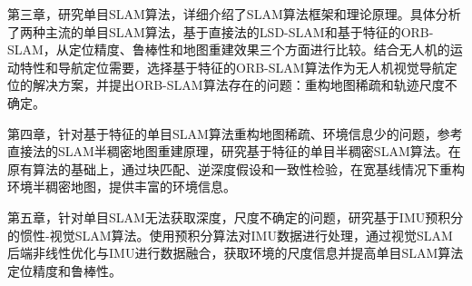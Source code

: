 第三章，研究单目SLAM算法，详细介绍了SLAM算法框架和理论原理。具体分析了两种主流的单目SLAM算法，基于直接法的LSD-SLAM和基于特征的ORB-SLAM，从定位精度、鲁棒性和地图重建效果三个方面进行比较。结合无人机的运动特性和导航定位需要，选择基于特征的ORB-SLAM算法作为无人机视觉导航定位的解决方案，并提出ORB-SLAM算法存在的问题：重构地图稀疏和轨迹尺度不确定。

第四章，针对基于特征的单目SLAM算法重构地图稀疏、环境信息少的问题，参考直接法的SLAM半稠密地图重建原理，研究基于特征的单目半稠密SLAM算法。在原有算法的基础上，通过块匹配、逆深度假设和一致性检验，在宽基线情况下重构环境半稠密地图，提供丰富的环境信息。

第五章，针对单目SLAM无法获取深度，尺度不确定的问题，研究基于IMU预积分的惯性-视觉SLAM算法。使用预积分算法对IMU数据进行处理，通过视觉SLAM后端非线性优化与IMU进行数据融合，获取环境的尺度信息并提高单目SLAM算法定位精度和鲁棒性。
